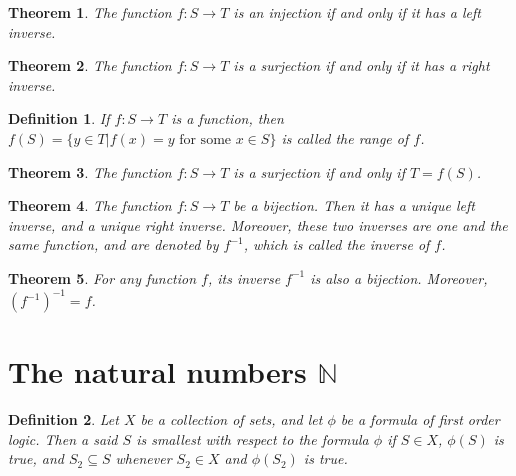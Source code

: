 \documentclass[a4paper]{article}
\newtheorem{mytheorem}{Theorem}
\newtheorem{mydef}{Definition}
\numberwithin{mytheorem}{section}
\numberwithin{mydef}{section}
\numberwithin{axiom}{section}
\numberwithin{example}{section}
\begin{document}
\begin{mytheorem} The function $f: S \rightarrow T$ is an injection if and only if it has a left inverse.
\end{mytheorem}

\begin{mytheorem} The function $f: S \rightarrow T$ is a surjection if and only if it has a right inverse.
\end{mytheorem}

\begin{mydef} If $f: S \rightarrow T$ is a function, then $f(S) = \{ y \in T | f(x) = y \text { for some } x \in S \} $ is called the range of $f$.
\end{mydef}

\begin{mytheorem} The function $f: S \rightarrow T$ is a surjection if and only if $T = f(S)$. \end{mytheorem}

\begin{mytheorem} The function $f: S \rightarrow T$ be a bijection. Then it has a unique left inverse, and a unique right inverse. Moreover, these two inverses are one and the same function, and are denoted by $f^{-1}$, which is called the inverse of $f$. \end{mytheorem}

\begin{mytheorem} For any function $f$, its inverse $f^{-1}$ is also a bijection. Moreover, $(f^{-1})^{-1} = f$. \end{mytheorem}

\section{The natural numbers $\mathbb{N}$}

\begin{mydef} Let $X$ be a collection of sets, and let $\phi$ be a formula of first order logic. Then a said $S$ is smallest with respect to the formula $\phi$ if $S \in X$, $\phi(S)$ is true, and $S_{2} \subseteq S$ whenever $S_{2} \in X$ and $\phi(S_{2})$ is true.
\end{mydef}

\end{document}
